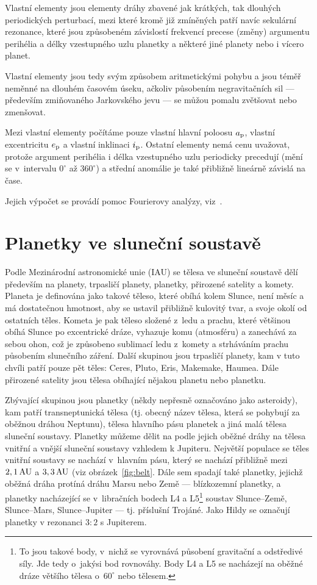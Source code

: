 \documentclass[A4paper, 12pt, oneside]{book}
\begin{document}
Vlastní elementy jsou elementy dráhy zbavené jak krátkých, tak dlouhých periodických perturbací, mezi které kromě již zmíněných patří navíc sekulární rezonance, které jsou způsobeném závislostí frekvencí precese (změny) argumentu perihélia a délky vzestupného uzlu planetky a některé jiné planety nebo i vícero planet.

Vlastní elementy jsou tedy svým způsobem aritmetickými  pohybu a jsou téměř neměnné na dlouhém časovém úseku, ačkoliv působením negravitačních sil --- především zmiňovaného Jarkovského jevu --- se můžou pomalu zvětšovat nebo zmenšovat. 

Mezi vlastní elementy počítáme pouze vlastní hlavní poloosu $a_{\rm p}$, vlastní excentricitu $e_{\rm p}$ a vlastní inklinaci $i_{\rm p}$. Ostatní elementy nemá cenu uvažovat, protože argument perihélia i délka vzestupného uzlu periodicky precedují (mění se v~intervalu $0^\circ$ až $360^\circ$) a střední anomálie je také přibližně lineárně závislá na čase.

Jejich výpočet se provádí pomoc Fourierovy analýzy, viz~\cite{sidlichovsky96}. 

\chapter{Planetky ve sluneční soustavě}


Podle Mezinárodní astronomické unie (IAU) se tělesa ve sluneční soustavě dělí především na planety, trpasličí planety, planetky, přirozené satelity a komety. Planeta je definována jako takové těleso, které obíhá kolem Slunce, není měsíc a má dostatečnou hmotnost, aby se ustavil přibližně kulovitý tvar, a  svoje okolí od ostatních těles. Kometa je pak těleso složené z~ledu a prachu, které většinou obíhá Slunce po excentrické dráze, vyhazuje komu (atmosféru) a zanechává za sebou ohon, což je způsobeno sublimací ledu z~komety a strháváním prachu působením slunečního záření.  Další skupinou jsou trpasličí planety, kam v tuto chvíli patří pouze pět těles: Ceres, Pluto, Eris, Makemake, Haumea. Dále přirozené satelity jsou tělesa obíhající nějakou planetu nebo planetku.

Zbývající skupinou jsou planetky (někdy nepřesně označováno jako asteroidy), kam patří transneptunická tělesa (tj. obecný název tělesa, která se pohybují za oběžnou dráhou Neptunu), tělesa hlavního pásu planetek a jiná malá tělesa sluneční soustavy. Planetky můžeme dělit na podle jejich oběžné dráhy na tělesa vnitřní a vnější sluneční soustavy vzhledem k Jupiteru. Největší populace se těles vnitřní soustavy se nachází v~hlavním pásu, který se nachází přibližně mezi $2,1\, {\rm AU}$ a $3,3\, {\rm AU}$ (viz obrázek~\ref{fig:belt}. Dále sem spadají také planetky, jejichž oběžná dráha protíná dráhu Marsu nebo Země --- blízkozemní planetky, a planetky nacházející se v~libračních bodech L4 a L5\footnote{To jsou takové body, v~nichž se vyrovnává působení gravitační a odstředivé síly. Jde tedy o~jakýsi bod rovnováhy. Body L4 a L5 se nacházejí na oběžné dráze většího tělesa o~$60^\circ$  nebo  tělesem.} soustav Slunce--Země, Slunce--Mars, Slunce--Jupiter --- tj. příslušní Trojáné. Jako Hildy se označují planetky v rezonanci $3:2$ s Jupiterem.
\end{document}
